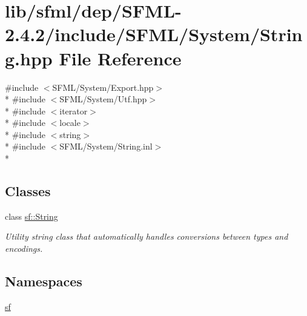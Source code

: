 \hypertarget{sfml_2dep_2_s_f_m_l-2_84_82_2include_2_s_f_m_l_2_system_2_string_8hpp}{\section{lib/sfml/dep/\-S\-F\-M\-L-\/2.4.2/include/\-S\-F\-M\-L/\-System/\-String.hpp File Reference}
\label{sfml_2dep_2_s_f_m_l-2_84_82_2include_2_s_f_m_l_2_system_2_string_8hpp}
}
{\ttfamily \#include $<$S\-F\-M\-L/\-System/\-Export.\-hpp$>$}\\*
{\ttfamily \#include $<$S\-F\-M\-L/\-System/\-Utf.\-hpp$>$}\\*
{\ttfamily \#include $<$iterator$>$}\\*
{\ttfamily \#include $<$locale$>$}\\*
{\ttfamily \#include $<$string$>$}\\*
{\ttfamily \#include $<$S\-F\-M\-L/\-System/\-String.\-inl$>$}\\*
\subsection*{Classes}
\begin{DoxyCompactItemize}
\item 
class \hyperlink{classsf_1_1_string}{sf\-::\-String}
\begin{DoxyCompactList}\small\item\em Utility string class that automatically handles conversions between types and encodings. \end{DoxyCompactList}\end{DoxyCompactItemize}
\subsection*{Namespaces}
\begin{DoxyCompactItemize}
\item 
\hyperlink{namespacesf}{sf}
\end{DoxyCompactItemize}
